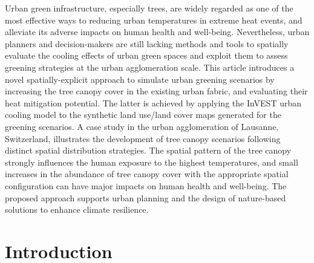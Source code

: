 \documentclass[10pt,letterpaper]{article}
\begin{document}
Urban green infrastructure, especially trees, are widely regarded as one of the most effective ways to reducing urban temperatures in extreme heat events, and alleviate its adverse impacts on human health and well-being.
Nevertheless, urban planners and decision-makers are still lacking methods and tools to spatially evaluate the cooling effects of urban green spaces and exploit them to assess greening strategies at the urban agglomeration scale.
This article introduces a novel spatially-explicit approach to simulate urban greening scenarios by increasing the tree canopy cover in the existing urban fabric, and evaluating their heat mitigation potential.
The latter is achieved by applying the InVEST urban cooling model to the synthetic land use/land cover maps generated for the greening scenarios.
A case study in the urban agglomeration of Lausanne, Switzerland, illustrates the development of tree canopy scenarios following distinct spatial distribution strategies.
The spatial pattern of the tree canopy strongly influences the human exposure to the highest temperatures, and small increases in the abundance of tree canopy cover with the appropriate spatial configuration can have major impacts on human health and well-being.
The proposed approach supports urban planning and the design of nature-based solutions to enhance climate resilience.


\linenumbers

\section*{Introduction}

\end{document}
